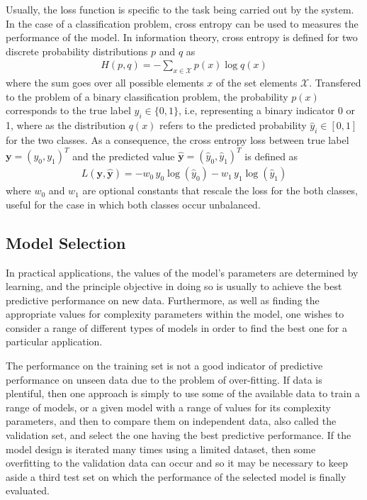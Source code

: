 \documentclass{scrartcl}
\begin{document}
Usually, the loss function is specific to the task being carried out by the system. In the case of a classification problem, cross entropy can be used to measures the performance of the model. In information theory, cross entropy is defined for two discrete probability distributions $p$ and $q$ as
\begin{align}
H(p,q) = - \sum_{x \in \mathcal X} p(x) \log q(x)
\end{align}
where the sum goes over all possible elements $x$ of the set elements $\mathcal X$. Transfered to the problem of a binary classification problem, the probability $p(x)$ corresponds to the true label $y_i \in \{0,1\}$, i.e, representing a binary indicator 0 or 1, where as the distribution $q(x)$ refers to the predicted probability $\hat{y}_i \in [0,1]$ for the two classes. As a consequence, the cross entropy loss between true label $\mathbf y = (y_0, y_1)^T$ and the predicted value $\hat{\mathbf y}= (\hat{y}_0, \hat{y}_1)^T$ is defined as
\begin{align}
\label{eq:binary_cros_entropy_loss}
L(\mathbf y, \hat{\mathbf y}) = - w_0 \,y_0 \log(\hat{y}_0)-w_1\,y_1 \log(\hat{y}_1)
\end{align} 
where $w_0$ and $w_1$ are optional constants that rescale the loss for the both classes, useful for the case in which both classes occur unbalanced.









\subsection{Model Selection}

In practical applications, the values of the model's parameters are determined by learning, and the principle objective in doing so is usually to achieve the best predictive performance on new data. Furthermore, as well as finding the appropriate values for complexity parameters within the model, one wishes to consider a range of different types of models in order to find the best one for a particular application. 

The performance on the training set is not a good indicator of predictive performance on unseen data due to the problem of over-fitting. If data is plentiful, then one approach is simply to use some of the available data to train a range of models, or a given model with a range of values for its complexity parameters, and then to compare them on independent data, also called the validation set, and select the one having the best predictive performance. If the model design is iterated many times using a limited dataset, then some overfitting to the validation data can occur and so it may be necessary to keep aside a third test set on which the performance of the selected model is finally evaluated. 
\end{document}
